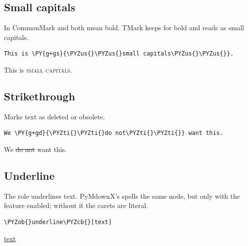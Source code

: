 \documentclass[a4paper,twoside]{article}
\begin{document}
\subsection{Small capitals}
In CommonMark \tscodeinline{**} and \tscodeinline{\_\_} both mean bold. TMark keeps \tscodeinline{**} for bold and reads \tscodeinline{\_\_} as small capitals.
\begin{tscode}[lang=md, engine=pygments]
\begin{Verbatim}[commandchars=\\\{\},breaklines, breakanywhere, commandchars=\\\{\}]
This is \PY{g+gs}{\PYZus{}\PYZus{}small capitals\PYZus{}\PYZus{}}.
\end{Verbatim}
\end{tscode}
\begin{displayquote}
This is \textsc{small capitals}.
\end{displayquote}
\subsection{Strikethrough}
Marks text as deleted or obsolete.
\begin{tscode}[lang=md, engine=pygments]
\begin{Verbatim}[commandchars=\\\{\},breaklines, breakanywhere, commandchars=\\\{\}]
We \PY{g+gd}{\PYZti{}\PYZti{}do not\PYZti{}\PYZti{}} want this.
\end{Verbatim}
\end{tscode}
\begin{displayquote}
We \sout{do not} want this.
\end{displayquote}
\subsection{Underline}
The  role underlines text. PyMdownX's  spells the same
node, but only with the  feature enabled; without it the carets
are literal.
\begin{tscode}[lang=md, engine=pygments]
\begin{Verbatim}[commandchars=\\\{\},breaklines, breakanywhere, commandchars=\\\{\}]
\PYZob{}underline\PYZcb{}[text]
\end{Verbatim}
\end{tscode}
\begin{displayquote}
\uline{text}
\end{displayquote}
\end{document}
